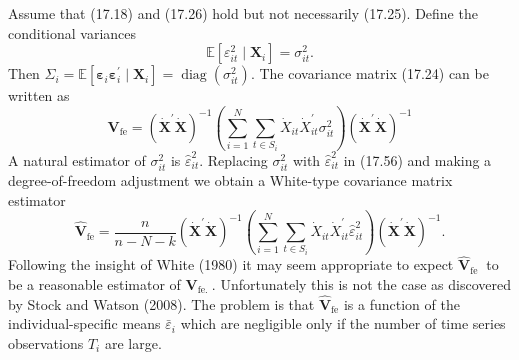 \documentclass[10pt]{article}
\begin{document}
Assume that (17.18) and (17.26) hold but not necessarily (17.25). Define the conditional variances
$$
\mathbb{E}\left[\varepsilon_{i t}^{2} \mid \boldsymbol{X}_{i}\right]=\sigma_{i t}^{2} .
$$
Then $\Sigma_{i}=\mathbb{E}\left[\boldsymbol{\varepsilon}_{i} \boldsymbol{\varepsilon}_{i}^{\prime} \mid \boldsymbol{X}_{i}\right]=\operatorname{diag}\left(\sigma_{i t}^{2}\right)$. The covariance matrix (17.24) can be written as
$$
\boldsymbol{V}_{\mathrm{fe}}=\left(\dot{\boldsymbol{X}}^{\prime} \dot{\boldsymbol{X}}\right)^{-1}\left(\sum_{i=1}^{N} \sum_{t \in S_{i}} \dot{X}_{i t} \dot{X}_{i t}^{\prime} \sigma_{i t}^{2}\right)\left(\dot{\boldsymbol{X}}^{\prime} \dot{\boldsymbol{X}}\right)^{-1}
$$
A natural estimator of $\sigma_{i t}^{2}$ is $\widehat{\varepsilon}_{i t}^{2}$. Replacing $\sigma_{i t}^{2}$ with $\widehat{\varepsilon}_{i t}^{2}$ in (17.56) and making a degree-of-freedom adjustment we obtain a White-type covariance matrix estimator
$$
\widehat{\boldsymbol{V}}_{\mathrm{fe}}=\frac{n}{n-N-k}\left(\dot{\boldsymbol{X}}^{\prime} \dot{\boldsymbol{X}}\right)^{-1}\left(\sum_{i=1}^{N} \sum_{t \in S_{i}} \dot{X}_{i t} \dot{X}_{i t}^{\prime} \widehat{\varepsilon}_{i t}^{2}\right)\left(\dot{\boldsymbol{X}}^{\prime} \dot{\boldsymbol{X}}\right)^{-1} .
$$
Following the insight of White (1980) it may seem appropriate to expect $\widehat{\boldsymbol{V}}_{\text {fe }}$ to be a reasonable estimator of $\boldsymbol{V}_{\text {fe. }}$. Unfortunately this is not the case as discovered by Stock and Watson (2008). The problem is that $\widehat{\boldsymbol{V}}_{\mathrm{fe}}$ is a function of the individual-specific means $\bar{\varepsilon}_{i}$ which are negligible only if the number of time series observations $T_{i}$ are large.
\end{document}
